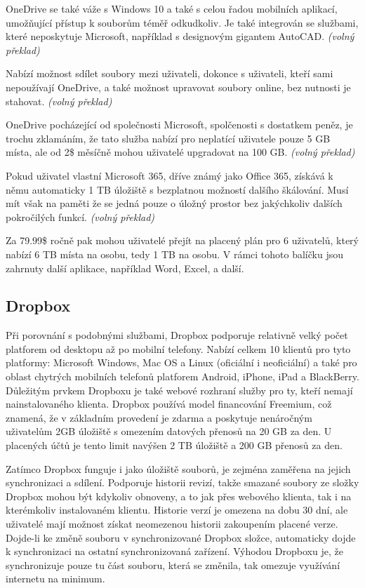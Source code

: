 \documentclass[
  glossaries,
]{kidiplom}
\begin{document}
OneDrive se také váže s Windows 10 a také s celou řadou mobilních aplikací, umožňující přístup k souborům téměř odkudkoliv. Je také integrován se službami, které neposkytuje Microsoft, například s designovým gigantem AutoCAD. \cite{CLOUDSOLUTIONS} \textit {(volný překlad)}

Nabízí možnost sdílet soubory mezi uživateli, dokonce s uživateli, kteří sami nepoužívají OneDrive, a také možnost upravovat soubory online, bez nutnosti je stahovat. \cite{CLOUDSOLUTIONS} \textit {(volný překlad)}

OneDrive pocházející od společnosti Microsoft, spolčenosti s dostatkem peněz, je trochu zklamáním, že tato služba nabízí pro neplatící uživatele pouze 5 GB místa, ale od 2\$ měsíčně mohou uživatelé upgradovat na 100 GB. \cite{CLOUDSOLUTIONS} \textit {(volný překlad)}

Pokud uživatel vlastní Microsoft 365, dříve známý jako Office 365, získává k němu automaticky 1 TB úložiště s bezplatnou možností dalšího škálování. Musí mít však na paměti že se jedná pouze o úložný prostor bez jakýchkoliv dalších pokročilých funkcí. \cite{CLOUDSOLUTIONS} \textit {(volný překlad)}

Za 79.99\$ ročně pak mohou uživatelé přejít na placený plán pro 6 uživatelů, který nabízí 6 TB místa na osobu, tedy 1 TB na osobu. V rámci tohoto balíčku jsou zahrnuty další aplikace, například Word, Excel, a další. \cite{ONEDRIVE}

\subsection{Dropbox}
Při porovnání s podobnými službami, Dropbox podporuje relativně velký počet platforem od desktopu až po mobilní telefony. Nabízí celkem 10 klientů pro tyto platformy: Microsoft Windows, Mac OS a Linux (oficiální i neoficiální) a také pro oblast chytrých mobilních telefonů platforem Android, iPhone, iPad a BlackBerry. Důležitým prvkem Dropboxu je také webové rozhraní služby pro ty, kteří nemají nainstalovaného klienta. Dropbox používá model financování Freemium, což znamená, že v základním provedení je zdarma a poskytuje nenáročným uživatelům 2GB úložiště s omezením datových přenosů na 20 GB za den. U placených účtů je tento limit navýšen 2 TB úložiště a 200 GB přenosů za den. \cite{DROPBOX}

Zatímco Dropbox funguje i jako úložiště souborů, je zejména zaměřena na jejich synchronizaci a sdílení. Podporuje historii revizí, takže smazané soubory ze složky Dropbox mohou být kdykoliv obnoveny, a to jak přes webového klienta, tak i na kterémkoliv instalovaném klientu. Historie verzí je omezena na dobu 30 dní, ale uživatelé mají možnost získat neomezenou historii zakoupením placené verze. Dojde-li ke změně souboru v synchronizované Dropbox složce, automaticky dojde k synchronizaci na ostatní synchronizovaná zařízení. Výhodou Dropboxu je, že synchronizuje pouze tu část souboru, která se změnila, tak omezuje využívání internetu na minimum. \cite{DROPBOX}
\end{document}
